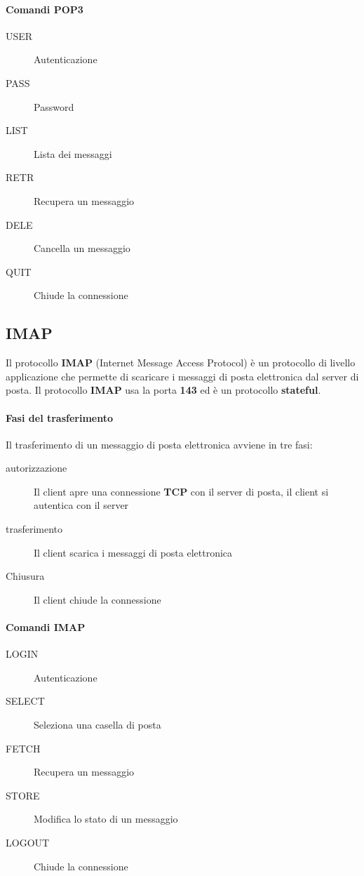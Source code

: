         \paragraph{Comandi POP3}
            \begin{description}
                \item[USER] Autenticazione
                \item[PASS] Password
                \item[LIST] Lista dei messaggi
                \item[RETR] Recupera un messaggio
                \item[DELE] Cancella un messaggio
                \item[QUIT] Chiude la connessione
            \end{description}
    \subsection{IMAP}
        Il protocollo \textbf{IMAP} (Internet Message Access Protocol) è un protocollo di livello applicazione che permette di scaricare i messaggi di posta elettronica dal server di posta. Il protocollo \textbf{IMAP} usa la porta \textbf{143} ed è un protocollo \textbf{stateful}.
        \paragraph{Fasi del trasferimento} Il trasferimento di un messaggio di posta elettronica avviene in tre fasi:
            \begin{description}
                \item[autorizzazione] Il client apre una connessione \textbf{TCP} con il server di posta, il client si autentica con il server
                \item[trasferimento] Il client scarica i messaggi di posta elettronica
                \item[Chiusura] Il client chiude la connessione
            \end{description}
        \paragraph{Comandi IMAP}
            \begin{description}
                \item[LOGIN] Autenticazione
                \item[SELECT] Seleziona una casella di posta
                \item[FETCH] Recupera un messaggio
                \item[STORE] Modifica lo stato di un messaggio
                \item[LOGOUT] Chiude la connessione
            \end{description}
